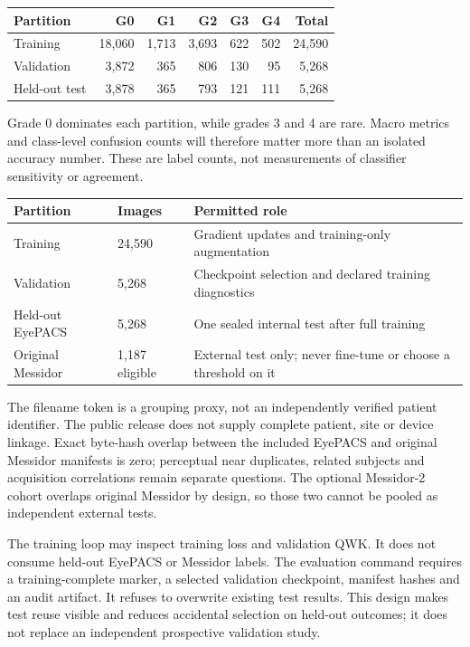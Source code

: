 \small
\begin{tabularx}{\linewidth}{@{}p{.23\linewidth}rrrrrr@{}}
\toprule
Partition & G0 & G1 & G2 & G3 & G4 & Total\\
\midrule
Training & 18,060 & 1,713 & 3,693 & 622 & 502 & 24,590\\
Validation & 3,872 & 365 & 806 & 130 & 95 & 5,268\\
Held-out test & 3,878 & 365 & 793 & 121 & 111 & 5,268\\
\bottomrule
\end{tabularx}
\normalsize
Grade 0 dominates each partition, while grades 3 and 4 are rare.
Macro metrics and class-level confusion counts will therefore matter
more than an isolated accuracy number. These are label counts, not
measurements of classifier sensitivity or agreement.

\small
\begin{tabularx}{\linewidth}{@{}p{.22\linewidth}p{.16\linewidth}Y@{}}
\toprule
Partition & Images & Permitted role\\
\midrule
Training & 24,590 & Gradient updates and training-only augmentation\\
Validation & 5,268 & Checkpoint selection and declared training diagnostics\\
Held-out EyePACS & 5,268 & One sealed internal test after full training\\
Original Messidor & 1,187 eligible & External test only; never fine-tune or
choose a threshold on it\\
\bottomrule
\end{tabularx}
\normalsize

The filename token is a grouping proxy, not an independently verified
patient identifier. The public release does not supply complete patient,
site or device linkage. Exact byte-hash overlap between the included
EyePACS and original Messidor manifests is zero; perceptual near
duplicates, related subjects and acquisition correlations remain separate
questions. The optional Messidor-2 cohort overlaps original Messidor by
design, so those two cannot be pooled as independent external tests.

The training loop may inspect training loss and validation QWK. It does
not consume held-out EyePACS or Messidor labels. The evaluation command
requires a training-complete marker, a selected validation checkpoint,
manifest hashes and an audit artifact. It refuses to overwrite existing
test results. This design makes test reuse visible and reduces accidental
selection on held-out outcomes; it does not replace an independent
prospective validation study.

